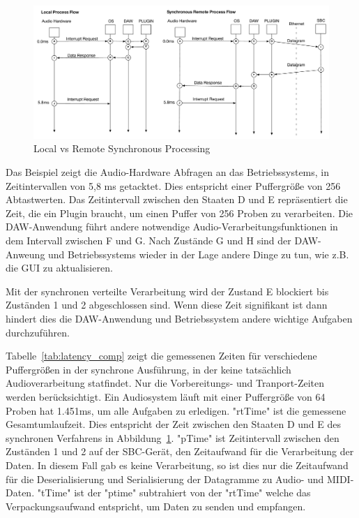\begin{figure}[H]
    \centering
    \includegraphics[width=\textwidth]{assets/conclusion/process_flow_compared.pdf}
    \caption{Local vs Remote Synchronous Processing}
    \label{fig:local_vs_remote}
\end{figure}

Das Beispiel zeigt die Audio-Hardware Abfragen an das Betriebssystems, in Zeitintervallen von 5,8 ms getacktet. Dies entspricht einer Puffergröße von 256 Abtastwerten. Das Zeitintervall zwischen den Staaten D und E repräsentiert die Zeit, die ein Plugin braucht, um einen Puffer von 256 Proben zu verarbeiten. Die DAW-Anwendung führt andere notwendige Audio-Verarbeitungsfunktionen in dem Intervall zwischen F und G. Nach Zustände G und H sind der DAW-Anweung und Betriebssystems wieder in der Lage andere Dinge zu tun, wie z.B. die GUI zu aktualisieren.

Mit der synchronen verteilte Verarbeitung wird der Zustand E blockiert bis Zuständen 1 und 2 abgeschlossen sind. Wenn diese Zeit signifikant ist dann hindert dies die DAW-Anwendung und Betriebssystem andere wichtige Aufgaben durchzuführen.



Tabelle~\ref{tab:latency_comp} zeigt die gemessenen Zeiten für verschiedene Puffergrößen in der synchrone Ausführung, in der keine tatsächlich Audioverarbeitung statfindet. Nur die Vorbereitungs- und Tranport-Zeiten werden berücksichtigt. Ein Audiosystem läuft mit einer Puffergröße von 64 Proben hat 1.451ms, um alle Aufgaben zu erledigen. "rtTime" ist die gemessene Gesamtumlaufzeit. Dies entspricht der Zeit zwischen den Staaten D und E des synchronen Verfahrens in Abbildung~\ref{fig:local_vs_remote}. "pTime" ist Zeitintervall zwischen den Zuständen 1 und 2 auf der SBC-Gerät, den Zeitaufwand für die Verarbeitung der Daten. In diesem Fall gab es keine Verarbeitung, so ist dies nur die Zeitaufwand für die Deserialisierung und Serialisierung der Datagramme zu Audio- und MIDI-Daten. "tTime" ist der "ptime" subtrahiert von der "rtTime" welche das Verpackungsaufwand entspricht, um Daten zu senden und empfangen.

